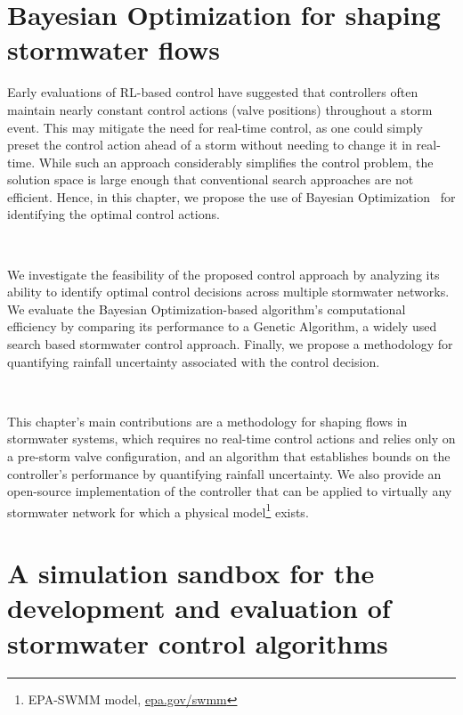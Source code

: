 \section{Bayesian Optimization for shaping stormwater flows}

Early evaluations of RL-based control have suggested that controllers often maintain nearly constant control actions (valve positions) throughout a storm event.
This may mitigate the need for real-time control, as one could simply preset the control action ahead of a storm without needing to change it in real-time. 
While such an approach considerably simplifies the control problem, the solution space is large enough that conventional search approaches are not efficient.
Hence, in this chapter, we propose the use of Bayesian Optimization~\cite{frazier2018tutorial} for identifying the optimal control actions.

\

We investigate the feasibility of the proposed control approach by analyzing its ability to identify optimal control decisions across multiple stormwater networks.
We evaluate the Bayesian Optimization-based algorithm's computational efficiency by comparing its performance to a Genetic Algorithm, a widely used search based stormwater control approach.
Finally, we propose a methodology for quantifying rainfall uncertainty associated with the control decision. 

\

This chapter's main contributions are a methodology for shaping flows in stormwater systems, which requires no real-time control actions and relies only on a pre-storm valve configuration, and an algorithm that establishes bounds on the controller's performance by quantifying rainfall uncertainty. We also provide an open-source implementation of the controller that can be applied to virtually any stormwater network for which a physical model\footnote{EPA-SWMM model, \href{https://www.epa.gov/water-research/storm-water-management-model-swmm}{epa.gov/swmm}} exists.

\section[\texttt{pystorms}]{A simulation sandbox for the development and evaluation of stormwater control algorithms}

